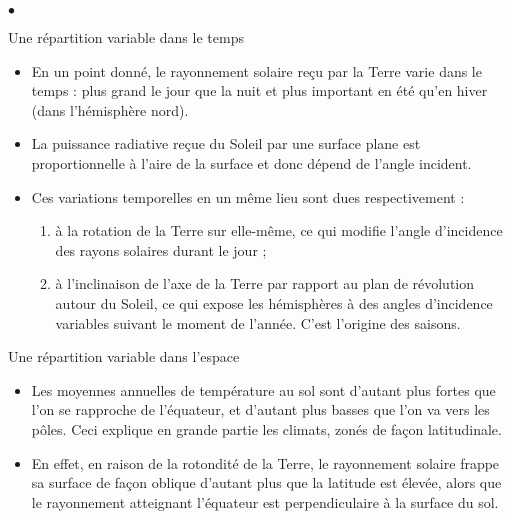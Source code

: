 \documentclass[10pt]{article}
\begin{document}
\begin{list}{$\bullet$}{}
	\item Une répartition variable dans le temps
	      \begin{itemize}
		      \item En un point donné, le rayonnement solaire reçu par la Terre varie dans le temps : plus grand le jour que la nuit et plus important en été qu’en hiver (dans l’hémisphère nord).
		      \item La puissance radiative reçue du Soleil par une surface plane est proportionnelle à l’aire de la surface et donc dépend de l’angle incident.
		      \item Ces variations temporelles en un même lieu sont dues respectivement :
		            \begin{enumerate}
			            \item à la rotation de la Terre sur elle-même, ce qui modifie l’angle d’incidence des rayons solaires durant le jour ;
			            \item à l’inclinaison de l’axe de la Terre par rapport au plan de révolution autour du Soleil, ce qui expose les hémisphères à des angles d’incidence variables suivant le moment de l’année.
			                  C’est l’origine des saisons.
		            \end{enumerate}

	      \end{itemize}
	\item Une répartition variable dans l’espace
	      \begin{itemize}
		      \item Les moyennes annuelles de température au sol sont d’autant plus fortes que l’on se rapproche de l’équateur, et d’autant plus basses que l’on va vers les pôles. Ceci explique en grande partie les climats, zonés de façon latitudinale.
		      \item En effet, en raison de la rotondité de la Terre, le rayonnement solaire frappe sa surface de façon oblique d’autant plus que la latitude est élevée, alors que le rayonnement atteignant l’équateur est perpendiculaire à la surface du sol.
	      \end{itemize}
\end{list}
\end{document}
